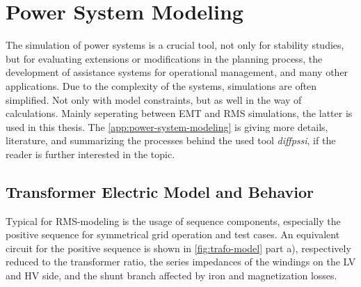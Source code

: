 \section{Power System Modeling}

The simulation of power systems is a crucial tool, not only for stability studies, but for evaluating extensions or modifications in the planning process, the development of assistance systems for operational management, and many other applications. \quelle 
Due to the complexity of the systems, simulations are often simplified. 
Not only with model constraints, but as well in the way of calculations. 
Mainly seperating between \acf{EMT} and \acf{RMS} simulations, the latter is used in this thesis. 
The \autoref{app:power-system-modeling} is giving more details, literature, and summarizing the processes behind the used tool \textit{diffpssi}, if the reader is further interested in the topic.

\subsection{Transformer Electric Model and Behavior}
\label{sec:trafo-model}


Typical for \acs{RMS}-modeling is the usage of sequence components, especially the positive sequence for symmetrical grid operation and test cases. \quelle 
An equivalent circuit for the positive sequence is shown in \autoref{fig:trafo-model} part a), respectively reduced to the transformer ratio, the series impedances of the windings on the \acs{LV} and \acs{HV} side, and the shunt branch affected by iron and magnetization losses. \autocite{machowski_2020,kundur_2022,milano_2010}

